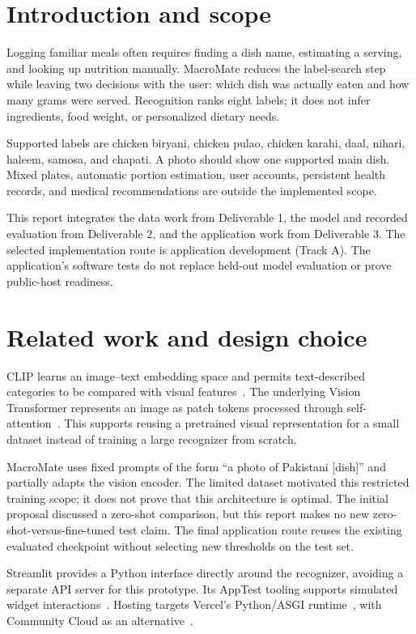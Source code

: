 \documentclass[11pt,a4paper]{article}
\begin{document}
\section{Introduction and scope}
Logging familiar meals often requires finding a dish name, estimating a serving,
and looking up nutrition manually. MacroMate reduces the label-search step while
leaving two decisions with the user: which dish was actually eaten and how many
grams were served. Recognition ranks eight labels; it does not infer ingredients,
food weight, or personalized dietary needs.

Supported labels are chicken biryani, chicken pulao, chicken karahi, daal, nihari,
haleem, samosa, and chapati. A photo should show one supported main dish. Mixed
plates, automatic portion estimation, user accounts, persistent health records,
and medical recommendations are outside the implemented scope.

This report integrates the data work from Deliverable 1, the model and recorded
evaluation from Deliverable 2, and the application work from Deliverable 3. The
selected implementation route is application development (Track A). The application's
software tests do not replace held-out model evaluation or prove public-host readiness.

\section{Related work and design choice}
CLIP learns an image--text embedding space and permits text-described categories
to be compared with visual features~\cite{clip}. The underlying Vision Transformer
represents an image as patch tokens processed through self-attention~\cite{vit}.
This supports reusing a pretrained visual representation for a small dataset
instead of training a large recognizer from scratch.

MacroMate uses fixed prompts of the form ``a photo of Pakistani [dish]'' and
partially adapts the vision encoder. The limited dataset motivated this restricted
training scope; it does not prove that this architecture is optimal. The initial
proposal discussed a zero-shot comparison, but this report makes no new
zero-shot-versus-fine-tuned test claim. The final application route reuses the
existing evaluated checkpoint without selecting new thresholds on the test set.

Streamlit provides a Python interface directly around the recognizer, avoiding a
separate API server for this prototype. Its AppTest tooling supports simulated
widget interactions~\cite{streamlit-test}. Hosting targets Vercel's Python/ASGI
runtime~\cite{vercel}, with Community Cloud as an alternative~\cite{streamlit-cloud}.
\end{document}
